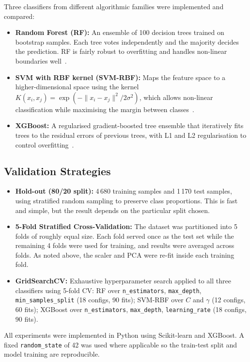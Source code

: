 \documentclass[11pt,a4paper]{article}
\begin{document}
Three classifiers from different algorithmic families were implemented and compared:
\begin{itemize}
    \item \textbf{Random Forest (RF):} An ensemble of 100 decision trees trained on bootstrap samples. Each tree votes independently and the majority decides the prediction. RF is fairly robust to overfitting and handles non-linear boundaries well~\cite{breiman2001random}.
    \item \textbf{SVM with RBF kernel (SVM-RBF):} Maps the feature space to a higher-dimensional space using the kernel $K(x_i, x_j) = \exp\left(-\|x_i - x_j\|^2 / 2\sigma^2\right)$, which allows non-linear classification while maximising the margin between classes~\cite{oskoei2007myoelectric}.
    \item \textbf{XGBoost:} A regularised gradient-boosted tree ensemble that iteratively fits trees to the residual errors of previous trees, with L1 and L2 regularisation to control overfitting~\cite{chen2016xgboost}.
\end{itemize}

\subsection{Validation Strategies}

\begin{itemize}
    \item \textbf{Hold-out (80/20 split):} 4\,680 training samples and 1\,170 test samples, using stratified random sampling to preserve class proportions. This is fast and simple, but the result depends on the particular split chosen.
    \item \textbf{5-Fold Stratified Cross-Validation:} The dataset was partitioned into 5 folds of roughly equal size. Each fold served once as the test set while the remaining 4 folds were used for training, and results were averaged across folds. As noted above, the scaler and PCA were re-fit inside each training fold.
    \item \textbf{GridSearchCV:} Exhaustive hyperparameter search applied to all three classifiers using 5-fold CV: RF over \texttt{n\_estimators}, \texttt{max\_depth}, \texttt{min\_samples\_split} (18 configs, 90 fits); SVM-RBF over $C$ and $\gamma$ (12 configs, 60 fits); XGBoost over \texttt{n\_estimators}, \texttt{max\_depth}, \texttt{learning\_rate} (18 configs, 90 fits).
\end{itemize}

All experiments were implemented in Python using Scikit-learn and XGBoost. A fixed \texttt{random\_state} of 42 was used where applicable so the train-test split and model training are reproducible.
\end{document}
